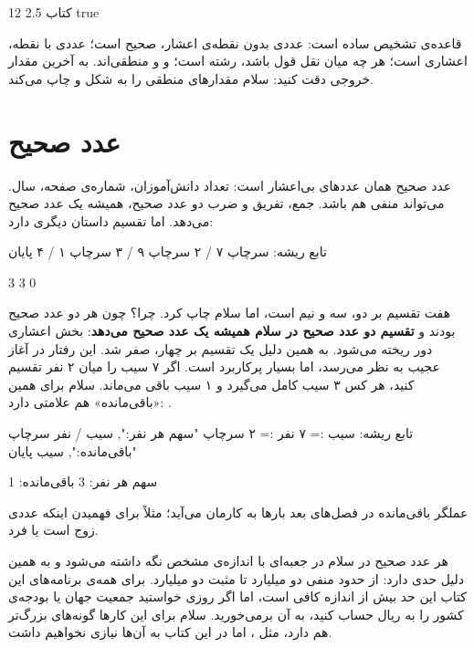 \begin{outputfa}
12 2.5 کتاب true
\end{outputfa}

قاعده‌ی تشخیص ساده است: عددی بدون نقطه‌ی اعشار، صحیح است؛ عددی با نقطه،
اعشاری است؛ هر چه میان نقل قول باشد، رشته است؛ و  و
 منطقی‌اند. به آخرین مقدار خروجی دقت کنید: سلام مقدارهای
منطقی را به شکل  و  چاپ می‌کند.

\section{عدد صحیح}

عدد صحیح همان عددهای بی‌اعشار است: تعداد دانش‌آموزان، شماره‌ی صفحه، سال.
می‌تواند منفی هم باشد. جمع، تفریق و ضرب دو عدد صحیح، همیشه یک عدد صحیح
می‌دهد. اما تقسیم داستان دیگری دارد:

\begin{salamfa}
تابع ریشه:
    سرچاپ ۷ / ۲
    سرچاپ ۹ / ۳
    سرچاپ ۱ / ۴
پایان
\end{salamfa}

\begin{outputfa}
3
3
0
\end{outputfa}

هفت تقسیم بر دو، سه و نیم است، اما سلام  چاپ کرد. چرا؟ چون هر دو
عدد صحیح بودند و \textbf{تقسیم دو عدد صحیح در سلام همیشه یک عدد صحیح
می‌دهد}: بخش اعشاری دور ریخته می‌شود. به همین دلیل یک تقسیم بر چهار، صفر
شد. این رفتار در آغاز عجیب به نظر می‌رسد، اما بسیار پرکاربرد است. اگر ۷
سیب را میان ۲ نفر تقسیم کنید، هر کس ۳ سیب کامل می‌گیرد و ۱ سیب باقی
می‌ماند. سلام برای همین «باقی‌مانده» هم علامتی دارد: \code{\%}.

\begin{salamfa}
تابع ریشه:
    سیب := ۷
    نفر := ۲
    سرچاپ "سهم هر نفر:", سیب / نفر
    سرچاپ "باقی‌مانده:", سیب %
پایان
\end{salamfa}

\begin{outputfa}
سهم هر نفر: 3
باقی‌مانده: 1
\end{outputfa}

عملگر باقی‌مانده در فصل‌های بعد بارها به کارمان می‌آید؛ مثلاً برای فهمیدن
اینکه عددی زوج است یا فرد.

\begin{deep}
هر عدد صحیح در سلام در جعبه‌ای با اندازه‌ی مشخص نگه داشته می‌شود و به همین
دلیل حدی دارد: از حدود منفی دو میلیارد تا مثبت دو میلیارد. برای همه‌ی
برنامه‌های این کتاب این حد بیش از اندازه کافی است، اما اگر روزی خواستید
جمعیت جهان یا بودجه‌ی کشور را به ریال حساب کنید، به آن برمی‌خورید. سلام
برای این کارها گونه‌های بزرگ‌تر هم دارد، مثل ، اما در این کتاب
به آن‌ها نیازی نخواهیم داشت.
\end{deep}

